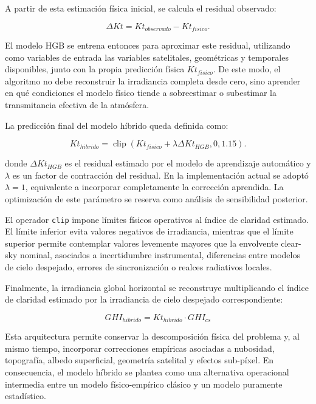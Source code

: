 \documentclass[../main.tex]{subfiles}
\begin{document}
A partir de esta estimación física inicial, se calcula el residual observado:

\begin{equation}
\Delta Kt =
Kt_{observado} - Kt_{fisico}.
\end{equation}

El modelo HGB se entrena entonces para aproximar este residual, utilizando como variables de entrada las variables satelitales, geométricas y temporales disponibles, junto con la propia predicción física $Kt_{fisico}$. De este modo, el algoritmo no debe reconstruir la irradiancia completa desde cero, sino aprender en qué condiciones el modelo físico tiende a sobreestimar o subestimar la transmitancia efectiva de la atmósfera.

La predicción final del modelo híbrido queda definida como:

\begin{equation}
Kt_{hibrido}
=
\operatorname{clip}
\left(
Kt_{fisico}
+
\lambda \Delta Kt_{HGB},
0,
1.15
\right).
\end{equation}

donde $\Delta Kt_{HGB}$ es el residual estimado por el modelo de aprendizaje automático y $\lambda$ es un factor de contracción del residual. En la implementación actual se adoptó $\lambda = 1$, equivalente a incorporar completamente la corrección aprendida. La optimización de este parámetro se reserva como análisis de sensibilidad posterior.

El operador \texttt{clip} impone límites físicos operativos al índice de claridad estimado. El límite inferior evita valores negativos de irradiancia, mientras que el límite superior permite contemplar valores levemente mayores que la envolvente clear-sky nominal, asociados a incertidumbre instrumental, diferencias entre modelos de cielo despejado, errores de sincronización o realces radiativos locales.

Finalmente, la irradiancia global horizontal se reconstruye multiplicando el índice de claridad estimado por la irradiancia de cielo despejado correspondiente:

\begin{equation}
    GHI_{hibrido} = Kt_{hibrido} \cdot GHI_{cs}
\end{equation}

Esta arquitectura permite conservar la descomposición física del problema y, al mismo tiempo, incorporar correcciones empíricas asociadas a nubosidad, topografía, albedo superficial, geometría satelital y efectos sub-píxel. En consecuencia, el modelo híbrido se plantea como una alternativa operacional intermedia entre un modelo físico-empírico clásico y un modelo puramente estadístico.
\end{document}
